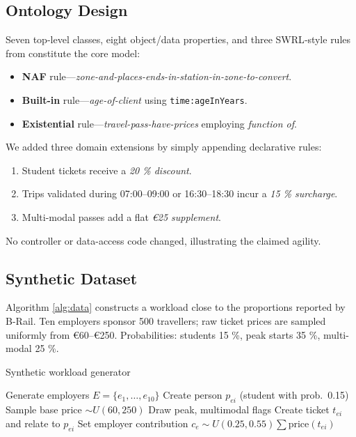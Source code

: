 \documentclass[lettersize,journal]{IEEEtran}
\begin{document}
\subsection{Ontology Design}
Seven top-level classes, eight object/data properties, and three SWRL‐style rules from \cite{ruleml24} constitute the core model:

\begin{itemize}
\item[\textbullet] \textbf{NAF} rule—\textit{zone-and-places-ends-in-station‐in-zone-to-convert}.  
\item[\textbullet] \textbf{Built-in} rule—\textit{age-of-client} using \texttt{time:ageInYears}.  
\item[\textbullet] \textbf{Existential} rule—\textit{travel-pass-have-prices} employing \emph{function of}.  
\end{itemize}

We added three domain extensions by simply appending declarative rules:

\begin{enumerate}
\item Student tickets receive a \emph{20 \% discount}.
\item Trips validated during 07:00–09:00 or 16:30–18:30 incur a \emph{15 \% surcharge}.
\item Multi-modal passes add a flat \emph{€25 supplement}.
\end{enumerate}

No controller or data-access code changed, illustrating the claimed agility.

\subsection{Synthetic Dataset}
Algorithm \ref{alg:data} constructs a workload close to the proportions reported by B-Rail.  
Ten employers sponsor 500 travellers; raw ticket prices are sampled uniformly from €60–€250.  
Probabilities: students 15 \%, peak starts 35 \%, multi-modal 25 \%.

\begin{algorithm}[!t]
\caption{Synthetic workload generator}
\label{alg:data}
\begin{algorithmic}[1]
\STATE Generate employers $E=\{e_1,\dots,e_{10}\}$
     \STATE Create person $p_{ei}$ (student with prob.\ 0.15)
     \STATE Sample base price $\sim U(60,250)$
     \STATE Draw peak, multimodal flags
     \STATE Create ticket $t_{ei}$ and relate to $p_{ei}$
  \ENDFOR
  \STATE Set employer contribution $c_e \sim U(0.25,0.55)\sum \text{price}(t_{ei})$
\ENDFOR
\end{algorithmic}
\end{algorithm}
\end{document}
